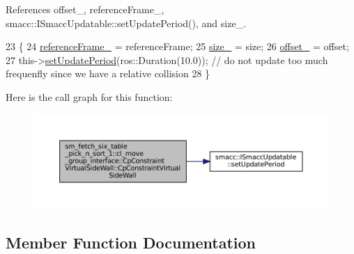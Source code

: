 References offset\+\_\+, reference\+Frame\+\_\+, smacc\+::\+I\+Smacc\+Updatable\+::set\+Update\+Period(), and size\+\_\+.


\begin{DoxyCode}
23         \{
24             \hyperlink{classsm__fetch__six__table__pick__n__sort__1_1_1cl__move__group__interface_1_1CpConstraintVirtualSideWall_ac40d9e21604237c88121c3d4b116ce39}{referenceFrame\_} = referenceFrame;
25             \hyperlink{classsm__fetch__six__table__pick__n__sort__1_1_1cl__move__group__interface_1_1CpConstraintVirtualSideWall_ad2633a49d0ab512b901fc5b63aae26f1}{size\_} = size;
26             \hyperlink{classsm__fetch__six__table__pick__n__sort__1_1_1cl__move__group__interface_1_1CpConstraintVirtualSideWall_aed69dc67bef1900a254e55031244a881}{offset\_} = offset;
27             this->\hyperlink{classsmacc_1_1ISmaccUpdatable_a88f3b092a81b2d8810a9776c8c69855b}{setUpdatePeriod}(ros::Duration(10.0)); \textcolor{comment}{// do not update too much frequenfly
       since we have a relative collision}
28         \}
\end{DoxyCode}
Here is the call graph for this function\+:
\nopagebreak
\begin{figure}[H]
\begin{center}
\leavevmode
\includegraphics[width=350pt]{classsm__fetch__six__table__pick__n__sort__1_1_1cl__move__group__interface_1_1CpConstraintVirtualSideWall_ab1335cd667ce462283b84886955325b6_cgraph}
\end{center}
\end{figure}


\subsection{Member Function Documentation}
\mbox{\label{classsm__fetch__six__table__pick__n__sort__1_1_1cl__move__group__interface_1_1CpConstraintVirtualSideWall_a1d7e720febc886a8b140eec81b2b397f}} 
